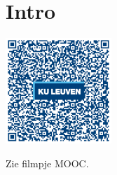 
\section*{Intro}
\begin{minipage}{.25\linewidth}
	\raggedright
	\includegraphics[width=4cm]{6_afgeleiden_integralen/inputs/QR_Code_INTRO_module6new}
\end{minipage}
\begin{minipage}{.7\linewidth}
	Zie filmpje MOOC.
\end{minipage}



\pagebreak


